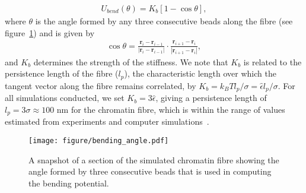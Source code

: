 \documentclass[12pt]{article}
\newcommand{\abs}[1]{\left|#1\right|}
\begin{document}
\begin{eqnarray}
U_{bend}(\theta) = K_b\left[1-\cos\theta\right],
\end{eqnarray}
where $\theta$ is the angle formed by any three consecutive beads along the fibre (see figure~\ref{fig:bending}) and is given by
\begin{eqnarray}
\cos \theta = \frac{\bm{r}_i - \bm{r}_{i-1}}{\abs{\bm{r}_i - \bm{r}_{i-1}}} \cdot \frac{\bm{r}_{i+1} - \bm{r}_i}{\abs{\bm{r}_{i+1} - \bm{r}_i}},
\end{eqnarray}
and $K_b$ determines the strength of the stiffness. We note that $K_b$ is related to the persistence length of the fibre ($l_p$), the characteristic length over which the tangent vector along the fibre remains correlated, by $K_b = k_BTl_p/\sigma = \hat{\epsilon}l_p/\sigma$. For all simulations conducted, we set $K_b = 3\hat{\epsilon}$, giving a persistence length of $l_p = 3\sigma \approx 100$ nm for the chromatin fibre, which is within the range of values estimated from experiments and computer simulations~\cite{dekker2002, bystricky2004, aumann2006}.

\begin{figure}[t]
\centering
\texttt{[image: figure/bending\_angle.pdf]}
\caption{A snapshot of a section of the simulated chromatin fibre showing the angle formed by three consecutive beads that is used in computing the bending potential.}
\label{fig:bending}
\end{figure}
\end{document}
